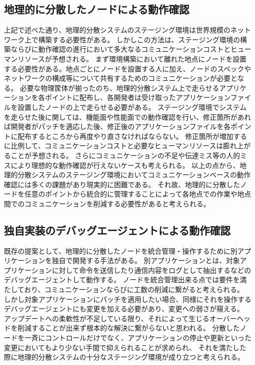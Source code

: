\subsection{地理的に分散したノードによる動作確認}
上記で述べた通り、地理的分散システムのステージング環境は世界規模のネットワーク上で構築する必要性がある。
しかしこの方法は、ステージング環境の構築ならびに動作確認の進行において多大なるコミュニケーションコストとヒューマンリソースが予想される。
まず環境構築において離れた地点にノードを設置する必要性がある。地点ごとにノードを設置する人に加え、ノードのスペックやネットワークの構成等について共有するためのコミュニケーションが必要となる。
必要な物理筐体が揃ったのち、地理的分散システム上で走らせるアプリケーションを各ポイントに配布し、各開発者は受け取ったアプリケーションファイルを設置したノードの上で走らせる必要がある。
ステージング環境でシステムを走らせた後に関しては、機能面や性能面での動作確認を行い、修正箇所があれば開発者がパッチを適応した後、修正後のアプリケーションファイルを各ポイントに配布するところから再度やり直さなければならない。
修正箇所が増加するに比例して、コミュニケーションコストと必要なヒューマンリソースは膨れ上がることが予想される。
さらにコミュニケーションの不足や伝達ミス等の人的ミスにより理想的な動作確認が行えないケースも考えられる。
以上の点から、地理的分散システムのステージング環境においてコミュニケーションベースの動作確認には多くの課題があり現実的に困難である。
それ故、地理的に分散したノードを任意のポイントから統合的に管理することによって各地点での作業や地点間でのコミュニケーションを削減する必要性があると考えられる。

\subsection{独自実装のデバッグエージェントによる動作確認}
既存の提案として、地理的に分散したノードを統合管理・操作するために別アプリケーションを独自で開発する手法がある。
別アプリケーションとは、対象アプリケーションに対して命令を送信したり通信内容をログとして抽出するなどのデバッグエージェントして動作する。
ノードを統合管理出来る点では要件を満たしており、コミュニケーションならびに工数の削減に繋がると考えられる。
しかし対象アプリケーションにパッチを適用したい場合、同様にそれを操作するデバッグエージェントにも変更を加える必要があり、変更への弱さが窺える。
アップデートへの柔軟性が不足している限り、それによって生じるオーバーヘッドを削減することが出来ず根本的な解決に繋がらないと思われる。
分散したノードを一斉にコントロールだけでなく、アプリケーションの停止や更新といった変更においてもより少ない手間で抑えられることが求められ、
それを満たした際に地理的分散システムの十分なステージング環境が成り立つと考えられる。

